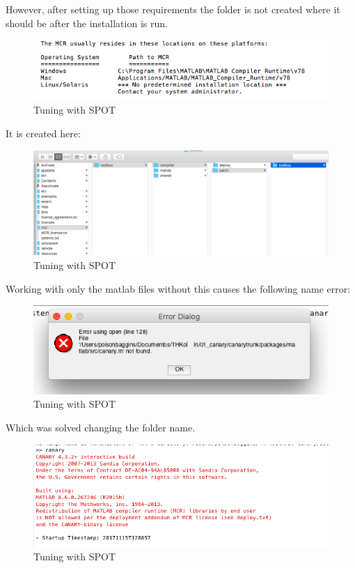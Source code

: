 \documentclass[runningheads]{llncs}
\begin{document}
However, after setting up those requirements the folder is not created where it should be after the installation is run.
\begin{figure}
\includegraphics[width=0.9\linewidth]{img/pathShould.png}
\caption{Tuning with SPOT}
\label{fig:tune2}
\end{figure}

It is created here:
\begin{figure}
\includegraphics[width=0.9\linewidth]{img/mcrPath.png}
\caption{Tuning with SPOT}
\label{fig:tune2}
\end{figure}

Working with only the matlab files without this causes the following name error:

\begin{figure}
\includegraphics[width=0.9\linewidth]{img/errorName.png}
\caption{Tuning with SPOT}
\label{fig:tune2}
\end{figure}

Which was solved changing the folder name.

\begin{figure}
\includegraphics[width=0.9\linewidth]{img/error1.png}
\caption{Tuning with SPOT}
\label{fig:tune2}
\end{figure}
\end{document}
